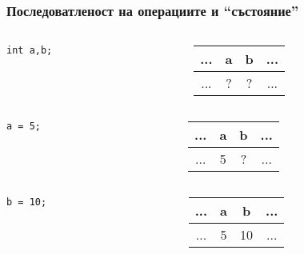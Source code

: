 \documentclass{beamer}
\begin{document}
\begin{frame}[fragile]
\frametitle{Последоватленост на операциите и ``състояние''}


\begin{columns}[c]
  \begin{column}{0.3\textwidth}
\begin{lstlisting}
int a,b;
\end{lstlisting}

  \end{column}
  \begin{column}{0.7\textwidth}
\begin{tabular}{ c | c | c | c}
\hline
... & a & b &  ...\\\hline
... & ? & ? & ... \\\hline
  
\end{tabular}

  \end{column}
\end{columns}

\pause

\begin{columns}[c]
  \begin{column}{0.3\textwidth}
\begin{lstlisting}
a = 5;
\end{lstlisting}

  \end{column}
  \begin{column}{0.7\textwidth}
\begin{tabular}{ c | c | c | c}
\hline
... & a & b &  ...\\\hline
... & \alert{5} & ? & ... \\\hline
  
\end{tabular}

  \end{column}
\end{columns}

\pause

\begin{columns}[c]
  \begin{column}{0.3\textwidth}
\begin{lstlisting}
b = 10;
\end{lstlisting}

  \end{column}
  \begin{column}{0.7\textwidth}
\begin{tabular}{ c | c | c | c}
\hline
... & a & b &  ...\\\hline
... & 5 & \alert{10} & ... \\\hline
  

\end{tabular}
\end{column}
\end{columns}
\end{frame}
\end{document}
